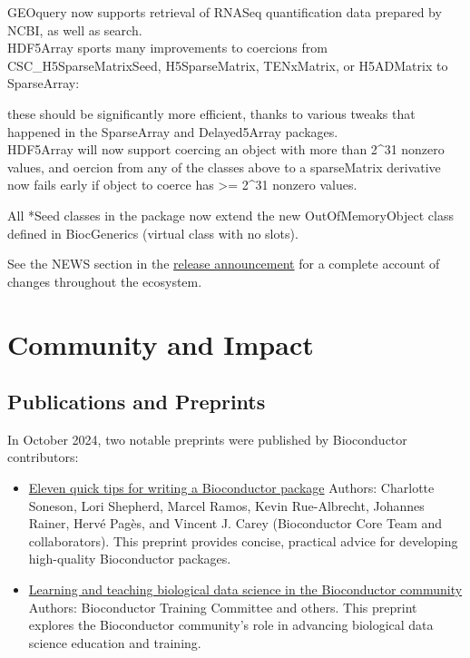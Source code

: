 GEOquery now supports retrieval of RNASeq quantification data prepared by NCBI,
as well as search.\\

HDF5Array sports many improvements to
coercions from CSC\_H5SparseMatrixSeed, H5SparseMatrix, TENxMatrix, or H5ADMatrix to SparseArray:

these should be significantly more efficient, thanks to various tweaks that happened in the SparseArray and Delayed5Array packages.\\

HDF5Array will now
support coercing an object with more than 2\^{}31 nonzero values,
and oercion from any of the classes above to a sparseMatrix derivative now fails early if object to coerce has \textgreater= 2\^{}31 nonzero values.

All *Seed classes in the package now extend the new OutOfMemoryObject class defined in BiocGenerics (virtual class with no slots).

See the NEWS section in the \href{https://bioconductor.org/news/bioc_3_20_release/}{release announcement} for
a complete account of changes throughout the ecosystem.

\hypertarget{community-and-impact}{%
\section{Community and Impact}\label{community-and-impact}}

\hypertarget{publications-and-preprints}{%
\subsection{Publications and Preprints}\label{publications-and-preprints}}

In October 2024, two notable preprints were published by Bioconductor contributors:

\begin{itemize}
\item
  \href{https://osf.io/preprints/osf/wxjky}{Eleven quick tips for writing a Bioconductor package}
  Authors: Charlotte Soneson, Lori Shepherd, Marcel Ramos, Kevin Rue-Albrecht, Johannes Rainer, Hervé Pagès, and Vincent J. Carey (Bioconductor Core Team and collaborators).
  This preprint provides concise, practical advice for developing high-quality Bioconductor packages.
\item
  \href{https://arxiv.org/abs/2410.01351}{Learning and teaching biological data science in the Bioconductor community}
  Authors: Bioconductor Training Committee and others.
  This preprint explores the Bioconductor community's role in advancing biological data science education and training.
\end{itemize}

